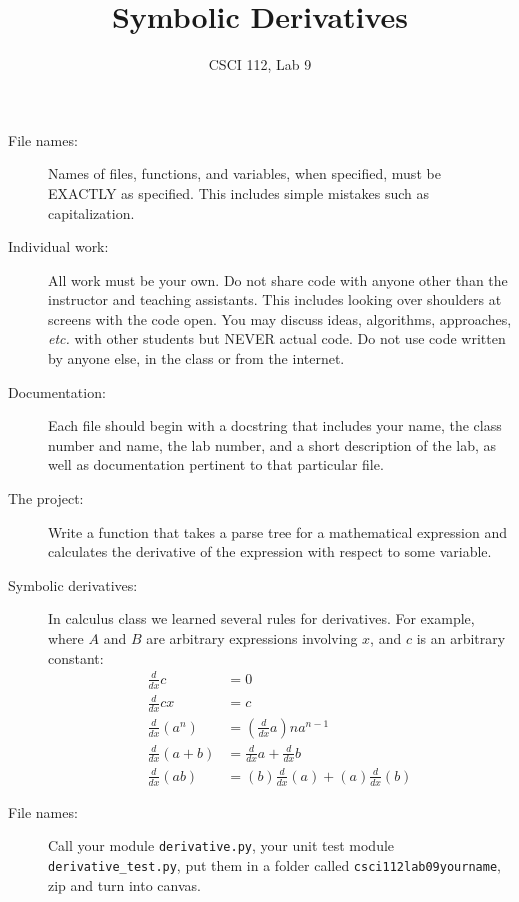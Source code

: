 \documentclass{article}
\title{Symbolic Derivatives}
\author{CSCI 112, Lab 9}
\date{}
\begin{document}
\sloppy

\maketitle

\begin{description} 
\item[File names:]  Names of files, functions, and variables, 
when specified,
must be EXACTLY as specified.  This includes simple mistakes such
as capitalization.

\item[Individual work:]  All work must be your own.  Do not share
code with anyone other than the instructor and teaching assistants.
This includes looking over shoulders at screens with the code open.
You may discuss ideas, algorithms, approaches, {\em etc.} with
other students but NEVER actual code.  Do not use code
written by anyone else, in the class or from the internet.

\item[Documentation:] Each file should begin with a docstring
that includes your name, the class number and name, the lab
number, and  
a short description of the lab, as well as documentation pertinent
to that particular file.

\item[The project:]  Write a function that takes a parse tree for a mathematical expression and calculates the derivative of the expression with respect to some variable.

\item[Symbolic derivatives:] In calculus class we learned several
rules for derivatives.  For example, where $A$ and $B$ are arbitrary
expressions involving $x$, and $c$ is an arbitrary constant:
\begin{align*}
\frac{d}{dx} c &= 0\\
\frac{d}{dx} cx &= c\\
\frac{d}{dx} \left(a^n\right) &= \left(\frac{d}{dx} a\right)na^{n-1} \\
\frac{d}{dx} \left(a + b\right) &= \frac{d}{dx} a + \frac{d}{dx} b\\
\frac{d}{dx} \left(ab\right) &= (b)\frac{d}{dx}(a) + (a) \frac{d}{dx} (b)
\end{align*}



\item[File names:]  Call your module \lstinline{derivative.py}, your unit test
module \lstinline{derivative_test.py}, put them in a folder called \lstinline{csci112lab09yourname},
zip and turn into canvas.

\end{description}
\end{document}
